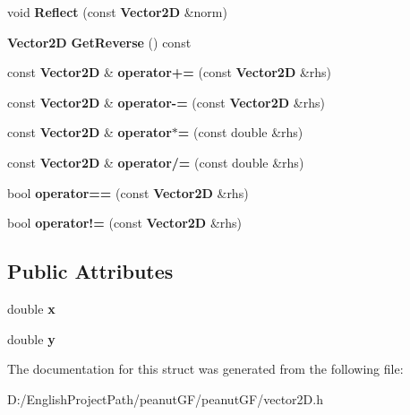 \begin{DoxyCompactItemize}
\mbox{\label{structpn_g_f_1_1_vector2_d_aae63dadd935975476d0753d73ec8044d}} 
void {\bfseries Reflect} (const \textbf{ Vector2D} \&norm)
\item 
\mbox{\label{structpn_g_f_1_1_vector2_d_a516989efd4ab2d68b030be9f9c378e44}} 
\textbf{ Vector2D} {\bfseries Get\+Reverse} () const
\item 
\mbox{\label{structpn_g_f_1_1_vector2_d_aac01d2b0d81266f1b5202765ff79ed1f}} 
const \textbf{ Vector2D} \& {\bfseries operator+=} (const \textbf{ Vector2D} \&rhs)
\item 
\mbox{\label{structpn_g_f_1_1_vector2_d_a8dc8e8e07ba4f6829f162815236a3b5a}} 
const \textbf{ Vector2D} \& {\bfseries operator-\/=} (const \textbf{ Vector2D} \&rhs)
\item 
\mbox{\label{structpn_g_f_1_1_vector2_d_af853a6aa0d888b7db0a8f766fbcb5e10}} 
const \textbf{ Vector2D} \& {\bfseries operator$\ast$=} (const double \&rhs)
\item 
\mbox{\label{structpn_g_f_1_1_vector2_d_aa51674d23e50c7033913c676fd0d40a6}} 
const \textbf{ Vector2D} \& {\bfseries operator/=} (const double \&rhs)
\item 
\mbox{\label{structpn_g_f_1_1_vector2_d_a60e6c30da42ec1b8b6316ac623520a1c}} 
bool {\bfseries operator==} (const \textbf{ Vector2D} \&rhs)
\item 
\mbox{\label{structpn_g_f_1_1_vector2_d_aa0ffaa128ceed660f967ecd05dbd33f1}} 
bool {\bfseries operator!=} (const \textbf{ Vector2D} \&rhs)
\end{DoxyCompactItemize}
\subsection*{Public Attributes}
\begin{DoxyCompactItemize}
\item 
\mbox{\label{structpn_g_f_1_1_vector2_d_a44947f41d6056e44c203c7d63741d7e5}} 
double {\bfseries x}
\item 
\mbox{\label{structpn_g_f_1_1_vector2_d_a38d8cb9b38784e5f45084e9b916bd2db}} 
double {\bfseries y}
\end{DoxyCompactItemize}


The documentation for this struct was generated from the following file\+:\begin{DoxyCompactItemize}
\item 
D\+:/\+English\+Project\+Path/peanut\+G\+F/peanut\+G\+F/vector2\+D.\+h\end{DoxyCompactItemize}
